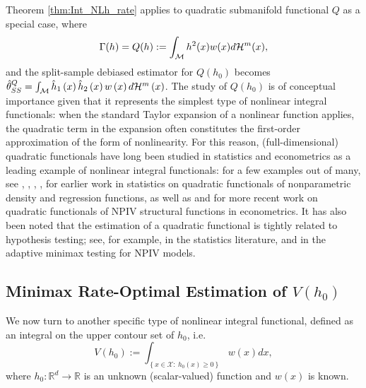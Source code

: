 \documentclass[12pt,american]{article}
\theoremstyle{definition}
\theoremstyle{plain}
\theoremstyle{definition}
\theoremstyle{plain}
\theoremstyle{plain}
\theoremstyle{plain}
\theoremstyle{plain}
\theoremstyle{plain}
\newcommand{\R}{\mathbb{R}}
\begin{document}
Theorem \ref{thm:Int_NLh_rate} applies to quadratic submanifold functional $Q$ as a special case, where
\begin{align}
  \Gamma(h)= Q(h) := \int_{\mathcal{M}} h^2(x) w(x) d\mathcal{H}^m(x),
\end{align}
and the split-sample debiased estimator for $Q(h_0)$ becomes
$\hat{\theta}^Q_{SS}=\int_{{\cal M}}\hat{h}_{1}\left(x\right)\hat{h}_{2}\left(x\right)w\left(x\right)d{\cal H}^{m}\left(x\right)$.
The study of $Q(h_0)$ is of conceptual importance given that it represents the simplest type of nonlinear integral functionals: when the standard Taylor expansion of a nonlinear function applies, the quadratic term in the expansion often constitutes the first-order approximation of the form of nonlinearity. For this reason, (full-dimensional) quadratic functionals have long been studied in statistics and econometrics as a leading example of nonlinear integral functionals: for a few examples out of many, see \cite{bickel1973some}, \cite{bickel1988estimating}, \cite{fan1991estimation}, \cite{efromovich1996optimal}, \cite{cai2005nonquadratic} for earlier work in statistics on quadratic functionals of nonparametric density and regression functions, as well as \cite{chen2018optimal} and \cite{breunig2019simple} for more recent work on quadratic functionals of NPIV structural functions in econometrics. It has also been noted that the estimation of a quadratic functional is tightly related to hypothesis testing; see, for example, \cite{cai2005nonquadratic,cai2006adaptive} in the statistics literature, and \cite{breunig2024adaptive} in the adaptive minimax testing for NPIV models.

\subsection{Minimax Rate-Optimal Estimation of $V(h_0)$}\label{subsec:Uch_rate-UB}

We now turn to another specific type of nonlinear integral functional, defined as an integral on the upper contour set of $h_0$, i.e.
\begin{equation}
  V\left(h_0\right):=\int_{\left\{x\in\mathcal{X}:~ h_0\left(x\right)\geq0\right\} }w\left(x\right)dx,\label{eq:Int_UCh}
\end{equation}
where $h_{0}:\R^{d}\to\R$ is an unknown (scalar-valued) function
and $w\left(x\right)$ is known.
\end{document}
